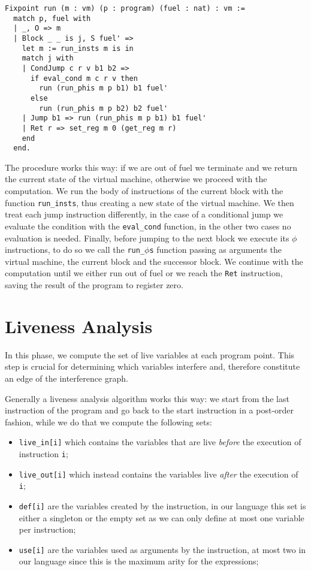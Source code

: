 \begin{lstlisting}[style=Coq]
Fixpoint run (m : vm) (p : program) (fuel : nat) : vm :=
  match p, fuel with
  | _, O => m
  | Block _ _ is j, S fuel' =>
    let m := run_insts m is in
    match j with
    | CondJump c r v b1 b2 =>
      if eval_cond m c r v then
        run (run_phis m p b1) b1 fuel'
      else
        run (run_phis m p b2) b2 fuel'
    | Jump b1 => run (run_phis m p b1) b1 fuel'
    | Ret r => set_reg m 0 (get_reg m r)
    end
  end.
\end{lstlisting}

The procedure works this way: if we are out of fuel we terminate and we return the current state of the virtual machine, otherwise we proceed with the computation.
We run the body of instructions of the current block with the function \texttt{run\_insts}, thus creating a new state of the virtual machine. We then treat each jump instruction differently, in the case of a conditional jump we evaluate the condition with the \texttt{eval\_cond} function, in the other two cases no evaluation is needed. Finally, before jumping to the next block we execute its $\phi$ instructions, to do so we call the \texttt{run\_$\phi$s} function  passing as arguments the virtual machine, the current block and the successor block.
We continue with the computation until we either run out of fuel or we reach the \texttt{Ret} instruction, saving the result of the program to register zero.

\section{Liveness Analysis}
\label{sec:liveness}

In this phase, we compute the set of live variables at each program point. This step is crucial for determining which variables interfere and, therefore constitute an edge of the interference graph.

Generally a liveness analysis algorithm works this way:
we start from the last instruction of the program and go back to the start instruction in a post-order fashion, while we do that we compute the following sets:
\begin{itemize}
  \item \texttt{live\_in[i]} which contains the variables that are live \textit{before} the execution of instruction \texttt i;
  \item \texttt{live\_out[i]} which instead contains the variables live \textit{after} the execution of \texttt i;
  \item \texttt{def[i]} are the variables created by the instruction, in our language this set is either a singleton or the empty set as we can only define at most one variable per instruction;
  \item \texttt{use[i]} are the variables used as arguments by the instruction, at most two in our language since this is the maximum arity for the expressions;
\end{itemize}

